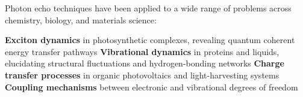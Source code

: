 \noindent Photon echo techniques have been applied to a wide range of problems across chemistry, biology, and materials science:

\textbf{Exciton dynamics} in photosynthetic complexes, revealing quantum coherent energy transfer pathways %
\textbf{Vibrational dynamics} in proteins and liquids, elucidating structural fluctuations and hydrogen-bonding networks \cite{hammzanni2011conceptsmethods2d}
\textbf{Charge transfer processes} in organic photovoltaics and light-harvesting systems
\textbf{Coupling mechanisms} between electronic and vibrational degrees of freedom \cite{khaliletal2004vibrationalcoherencetransfer}



